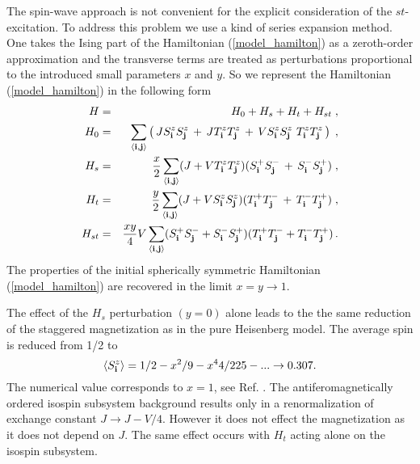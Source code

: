 The spin-wave approach is not convenient for the explicit consideration
of the $st$-excitation. To address this problem we use a kind of 
series expansion method. One takes the Ising part of the
Hamiltonian (\ref{model_hamilton}) as a zeroth-order approximation
and the transverse  terms are treated 
as perturbations proportional to the introduced small parameters 
$x$ and $y$. So we represent the Hamiltonian 
(\ref{model_hamilton}) in the following form
\begin{eqnarray}
\label{series_hamiltonian}
H  & = & H_{0} + H_s + H_t + H_{st} \; ,
\\
H_0 & = &
\sum_{\langle {\bf i,j} \rangle} 
\left ( \,
J S^z_{\bf i} S^z_{\bf j} \, + \,
J T^z_{\bf i} T^z_{\bf j} \, + \,
V S^z_{\bf i} S^z_{\bf j} \ T^z_{\bf i} T^z_{\bf j} 
\, \right) \; ,\nonumber\\
H_s & = & {x\over 2}\sum_{\langle {\bf i,j} \rangle} 
(J+V T^z_{\bf i} T^z_{\bf j} )
( S^+_{\bf i} S^-_{\bf j} \, + \, S^-_{\bf i} S^+_{\bf j} ) \; ,
\nonumber\\
H_t & = & {y\over 2}\sum_{\langle {\bf i,j} \rangle} 
(J+V S^z_{\bf i} S^z_{\bf j} )
( T^+_{\bf i} T^-_{\bf j} \, + \, T^-_{\bf i} T^+_{\bf j} ) \; ,
\nonumber\\
H_{st} & = & { {xy} \over 4} V \sum_{\langle {\bf i,j} \rangle} 
( S^+_{\bf i} S^-_{\bf j} + S^-_{\bf i} S^+_{\bf j} )
( T^+_{\bf i} T^-_{\bf j} + T^-_{\bf i} T^+_{\bf j} ) \, .
\nonumber
\end{eqnarray}
The properties of the initial spherically symmetric Hamiltonian
(\ref{model_hamilton}) are recovered in the  limit $x=y \to 1$.

The effect of the $H_s$ perturbation $(y=0)$ alone leads to the the same
reduction of the staggered magnetization as in the pure Heisenberg 
model.
The average spin is reduced from 1/2 to 
\begin{equation}
\label{sz}
\langle S^z_{\bf i} \rangle = 1/2 -x^2/9 -x^4 4/225 - ... 
\to 0.307.
\end{equation}
The numerical value corresponds to $x=1$, see Ref. \cite{zheng}. 
The antiferomagnetically ordered isospin 
subsystem background results only in a renormalization of exchange 
constant $J\to J-V/4$. However it does not effect the magnetization as 
it does not depend on $J$. 
The same effect occurs with $H_t$ acting alone on the isospin subsystem.

